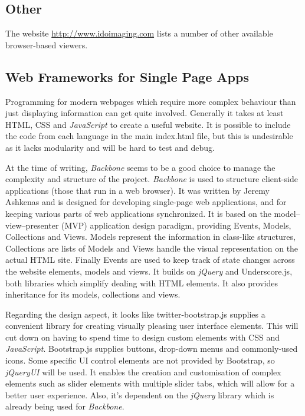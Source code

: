 \documentclass[a4paper,11pt,titlepage]{article}
\begin{document}
\subsection{Other}

The website \url{http://www.idoimaging.com} lists a number of other available browser-based viewers.


\subsection{Web Frameworks for Single Page Apps}

Programming for modern webpages which require more complex behaviour than just displaying information can get quite involved. Generally it takes at least HTML, CSS and \textit{JavaScript} to create a useful website. It is possible to include the code from each language in the main index.html file, but this is undesirable as it lacks modularity and will be hard to test and debug.

At the time of writing, \textit{Backbone} seems to be a good choice to manage the complexity and structure of the project. \textit{Backbone} is used to structure client-side applications (those that run in a web browser). It was written by Jeremy Ashkenas and is designed for developing single-page web applications, and for keeping various parts of web applications synchronized. It is based on the model–view–presenter (MVP) application design paradigm, providing Events, Models, Collections and Views. Models represent the information in class-like structures, Collections are lists of Models and Views handle the visual representation on the actual HTML site. Finally Events are used to keep track of state changes across the website elements, models and views. It builds on \textit{jQuery} and Underscore.js, both libraries which simplify dealing with HTML elements. It also provides inheritance for its models, collections and views.

Regarding the design aspect, it looks like twitter-bootstrap.js supplies a convenient library for creating visually pleasing user interface elements. This will cut down on having to spend time to design custom elements with CSS and \textit{JavaScript}. Bootstrap.js supplies buttons, drop-down menus and commonly-used icons. Some specific UI control elements are not provided by Bootstrap, so \textit{jQueryUI} will be used. It enables the creation and customisation of complex elements such as slider elements with multiple slider tabs, which will allow for a better user experience. Also, it's dependent on the \textit{jQuery} library which is already being used for \textit{Backbone}.
\end{document}
